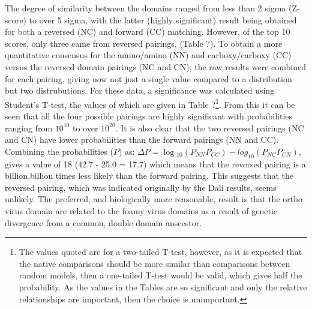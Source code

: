 The degree of similarity between the domains ranged from less than 2 sigma (Z-score)
to over 5 sigma, with the latter (highly significant) result being obtained for both
a reversed (NC) and forward (CC) matching.   However, of the top 10 scores, only
three came from reversed pairings.  (Table ?).  To obtain a more quantitative consensus
for the amino/amino (NN) and carboxy/carboxy (CC) versus the reversed domain pairings
(NC and CN), the raw results were combined for each pairing, giving now not just a
single value compared to a distribution but two distrubutions.   For these data,
a significance was calculated using Student's T-test, the values of which are given
in Table ?\footnote{
The values quoted are for a two-tailed T-test, however, as it is expected that the native
comparisons should be more similar than comparisons between random models, then a
one-tailed T-test would be valid, which gives half the probability.   As the values
in the Tables are so significant and only the relative relationships are important,
then the choice is unimportant.
}.
From this it can be seen that all the four possible pairings are
highly significant with probabilities ranging from $10^{10}$ to over $10^{20}$.
It is also clear that the two reversed pairings (NC and CN) have lower probabilities
than the forward pairings (NN and CC).   Combining the probabilities ($P$) as:
$\Delta P = \log{_10}(P_{NN} P_{CC}) - log_{10}(P_{NC} P_{CN})$,
gives a value of 18 (42.7 - 25.0 = 17.7) which means that the reversed pairing is
a billion,billion times less likely than the forward pairing.  This suggests that
the reversed pairing, which was indicated originally by the Dali results, seems unlikely. 
The preferred, and biologically more reasonable, result is that the ortho virus
domain are related to the foamy virus domains as a result of genetic divergence from
a common, double domain anscestor. 

